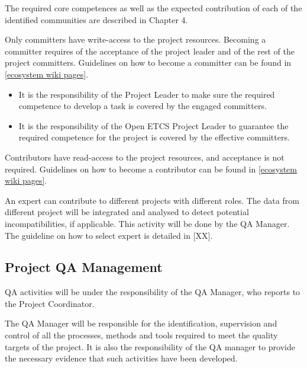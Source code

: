 \documentclass{template/openetcs_article}
\begin{document}
The required core competences as well as the expected contribution of each of the identified communities are described in Chapter 4.

Only committers have write-access to the project resources. Becoming a committer requires of the acceptance of the project leader and of the rest of the project committers. Guidelines on how to become a committer can be found in \href{https://github.com/openETCS/ecosystem/wiki/_pages}{[ecosystem wiki pages]}.

\begin{itemize}
\item It is the responsibility of the Project Leader to make sure the required competence to develop a task is covered by the engaged committers.
\item It is the responsibility of the Open \gls{ETCS} Project Leader to guarantee the required competence for the project is covered by the effective committers.
\end{itemize}

Contributors have read-access to the project resources, and acceptance is not required. Guidelines on how to become a contributor can be found in \href{https://github.com/openETCS/ecosystem/wiki/_pages}{[ecosystem wiki pages]}.

An expert can contribute to different projects with different roles. The data from different project will be integrated and analysed to detect potential incompatibilities, if applicable. This activity will be done by the QA Manager. The guideline on how to select expert is detailed in [XX].


\subsection{Project QA Management}
QA activities will be under the responsibility of the QA Manager, who reports to the Project Coordinator.

The QA Manager will be responsible for the identification, supervision and control of all the processes, methods and tools required to meet the quality targets of the project. It is also the responsibility of the QA manager to provide the necessary evidence that such activities have been developed.
\end{document}
